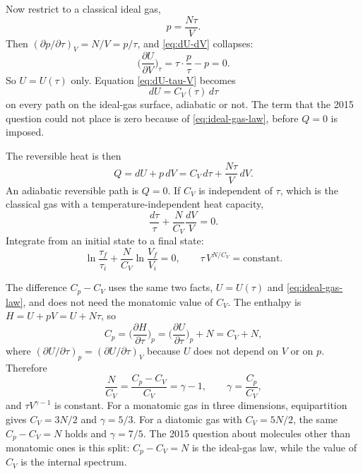 Now restrict to a classical ideal gas,
\begin{equation}
\label{eq:ideal-gas-law}
p = \frac{N\tau}{V}.
\end{equation}
Then \((\partial p/\partial\tau)_{V} = N/V = p/\tau\), and \eqref{eq:dU-dV} collapses:
\begin{equation}
\label{eq:joule-law}
\biggl(\frac{\partial U}{\partial V}\biggr)_{\tau}
= \tau\cdot\frac{p}{\tau} - p
= 0.
\end{equation}
So \(U = U(\tau)\) only. Equation \eqref{eq:dU-tau-V} becomes
\begin{equation}
\label{eq:dU-ideal}
dU = C_V(\tau)\, d\tau
\end{equation}
on every path on the ideal-gas surface, adiabatic or not. The term that the 2015 question could not place is zero because of \eqref{eq:ideal-gas-law}, before \(Q=0\) is imposed.

The reversible heat is then
\begin{equation}
\label{eq:Q-ideal}
Q = dU + p\, dV = C_V\, d\tau + \frac{N\tau}{V}\, dV.
\end{equation}
An adiabatic reversible path is \(Q=0\). If \(C_V\) is independent of \(\tau\), which is the classical gas with a temperature-independent heat capacity,
\begin{equation}
\label{eq:separate-adiabatic}
\frac{d\tau}{\tau} + \frac{N}{C_V}\frac{dV}{V} = 0.
\end{equation}
Integrate from an initial state to a final state:
\begin{equation}
\label{eq:adiabatic-TV}
\ln\frac{\tau_f}{\tau_i} + \frac{N}{C_V}\ln\frac{V_f}{V_i} = 0,
\qquad
\tau\, V^{N/C_V} = \mathrm{constant}.
\end{equation}

The difference \(C_p - C_V\) uses the same two facts, \(U=U(\tau)\) and \eqref{eq:ideal-gas-law}, and does not need the monatomic value of \(C_V\). The enthalpy is \(H = U + pV = U + N\tau\), so
\begin{equation}
\label{eq:Cp-minus-CV}
C_p
= \biggl(\frac{\partial H}{\partial\tau}\biggr)_{p}
= \biggl(\frac{\partial U}{\partial\tau}\biggr)_{p} + N
= C_V + N,
\end{equation}
where \((\partial U/\partial\tau)_{p} = (\partial U/\partial\tau)_{V}\) because \(U\) does not depend on \(V\) or on \(p\). Therefore
\begin{equation}
\label{eq:gamma-minus-one}
\frac{N}{C_V} = \frac{C_p - C_V}{C_V} = \gamma - 1,
\qquad
\gamma = \frac{C_p}{C_V},
\end{equation}
and \(\tau V^{\gamma-1}\) is constant. For a monatomic gas in three dimensions, equipartition gives \(C_V = 3N/2\) and \(\gamma = 5/3\). For a diatomic gas with \(C_V = 5N/2\), the same \(C_p - C_V = N\) holds and \(\gamma = 7/5\). The 2015 question about molecules other than monatomic ones is this split: \(C_p - C_V = N\) is the ideal-gas law, while the value of \(C_V\) is the internal spectrum.

